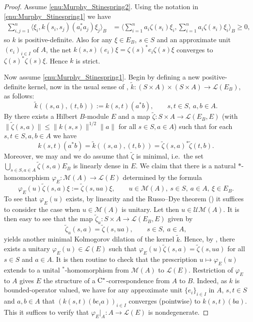 \documentclass[11 pt, leqno]{amsart}
\numberwithin{equation}{section}
\theoremstyle{plain}
\theoremstyle{definition}
\newcommand{\M}{\mathcal M}
\renewcommand{\L}{\mathcal L}
\newcommand{\cst}{\ifmmode\mathrm{C}^*\else{$\mathrm{C}^*$}\fi}
\begin{document}
\begin{proof} 
Assume \ref{enu:Murphy_Stinespring2}. 
Using the notation in \ref{enu:Murphy_Stinespring1} we have
\begin{align*}
    \sum_{i,j=1}^n \langle \xi_i, k(s_i,s_j) (a_i^*a_j)\xi_j\rangle_B
        &=\langle  \sum_{i=1}^n a_i\zeta(s_i)\xi_i, \sum_{i=1}^n  a_i\zeta(s_i) \xi_i\rangle_B \geq 0,
\end{align*}
so $k$ is positive-definite. 
Also for any $\xi\in E_B$, $s \in S$ and an approximate unit $(e_i)_{i \in I}$ of $A$, the net $k(s,s)(e_i)\xi=\zeta(s)^* e_i\zeta(s)\xi$ converges to $\zeta(s)^* \zeta(s)\xi$. 
Hence $k$ is strict.

Now assume \ref{enu:Murphy_Stinespring1}. 
Begin by defining a new positive-definite kernel, now in the usual sense of \cite{Mur}, $\tilde{k}:(S \times A) \times (S \times A) \to \L(E_B)$, as follows:
\[ 
    \tilde{k} ((s,a) , (t,b)):= k(s,t)(a^*b), \qquad s, t \in S,\ a,b \in A.
\]	
By \cite[Theorem 2.3]{Mur} there exists a Hilbert $B$-module $E$ and a map $\tilde{\zeta}: S\times A\to \L(E_B,E)$ (with  $\|\tilde{\zeta}(s,a)\|\leq \|k(s,s)\|^{1/2}\|a\|$ for all $s \in S, a \in A$) such that for each $s,t\in S, a,b \in A$ we have  
\begin{equation}\label{eq:Murphy_given}
    k(s,t)(a^*b)=\tilde{k} ((s,a),(t,b)) =\tilde{\zeta}(s,a)^* \tilde{\zeta}(t,b). 
\end{equation}
Moreover, we may and we do assume that $\tilde{\zeta}$ is minimal, i.e.\ the set $\bigcup_{s\in S, a \in A}\tilde{\zeta}(s,a)E_B$ is linearly dense in $E$.
We claim that there is a natural $*$-homomorphism $\varphi_E:\M(A)\to \L(E)$ %
determined by the formula 
\[
    \varphi_E(u)\tilde{\zeta}(s,a)\xi :=\tilde{\zeta}(s,ua)\xi, \qquad   u \in \M(A),\  s\in S,\ a\in A,\ \xi \in E_B .
\]
To see that $\varphi_E(u)$ exists, by linearity and the Russo--Dye theorem (\cite{RussoDye}) it suffices to consider the case when $u\in \M(A)$ is unitary. 
Let then $u \in \mathcal{UM}(A)$. 
It is then easy to see that the map $\tilde\zeta_u: S \times A\to \L(E_B,E) $ given by 
\[
    \tilde\zeta_u (s,a) = \tilde\zeta (s, ua), \qquad s \in S,\ a \in A,
\]
yields another minimal Kolmogorov dilation of the kernel $\tilde k$. 
Hence, by \cite[Theorem 2.3]{Mur}, there exists a unitary $\varphi_E(u) \in \L(E)$ such that $\varphi_E(u)\tilde\zeta (s, a) = \tilde\zeta (s, ua)$ for all $s \in S$ and  $a \in A$.
It is then routine to check that the prescription $u \mapsto \varphi_E(u)$  extends to a unital $^*$-homomorphism from $\M(A)$ to $\L(E)$.
Restriction of $\varphi_E$ to $A$  gives $E$ the  structure of a $\cst$-correspondence from $A$ to $B$. 
Indeed, as $k$ is bounded-operator valued, we have for any   approximate unit $\{e_i\}_{i \in I}$ in $A$, $s, t \in S$ and $a,b \in A$ that $(k(s,t)(be_i a))_{i \in I}$ converges (pointwise) to $k(s,t) (ba)$. 
This it suffices to verify that $\varphi_E|_A:A \to \L(E)$ is nondegenerate.


\end{proof}
\end{document}
